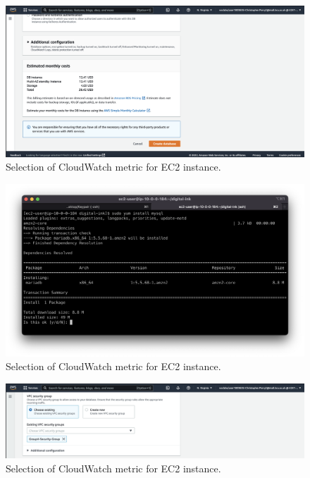 \begin{figure}[!htbp]
    \centering
    \includegraphics[width=\textwidth]{resources/rds/rds-monthly-costs.png}
    \caption{Selection of CloudWatch metric for EC2 instance.}
    \label{fig:rds-costs}
\end{figure}

\begin{figure}[!htbp]
    \centering
    \includegraphics[width=\textwidth]{resources/rds/rds-mysql-install.png}
    \caption{Selection of CloudWatch metric for EC2 instance.}
    \label{fig:rds-msql-install}
\end{figure}

\begin{figure}[!htbp]
    \centering
    \includegraphics[width=\textwidth]{resources/rds/rds-security-group.png}
    \caption{Selection of CloudWatch metric for EC2 instance.}
    \label{fig:rds-security}
\end{figure}

